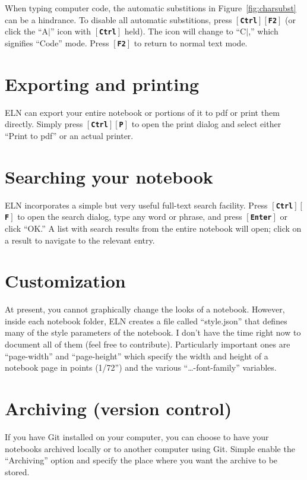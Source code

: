 \documentclass[11pt]{report}
\def\keystroke#1{$\left[\right.\!${\tt\bfseries #1}$\!\left.\right]$}
\def\key#1{\keystroke{#1}}
\def\keycombo#1#2{\keystroke{#1}\keystroke{#2}}
\def\keycontrol#1{\keycombo{Ctrl}{#1}}
\begin{document}
When typing computer code, the automatic substitions in
Figure~\ref{fig:charsubst} can be a hindrance. To disable all
automatic substitions, press \keycontrol{F2} (or click the
``A\hbox{$|$}'' icon with \key{Ctrl} held). The icon will
change to ``C\hbox{$|$},'' which signifies ``Code''
mode. Press \key{F2} to return to normal text mode.

\section{Exporting and printing}

ELN can export your entire notebook or portions of it to pdf or print
them directly. Simply press \keycontrol{P} to open the print dialog
and select either ``Print to pdf'' or an actual printer.

\section{Searching your notebook}

ELN incorporates a simple but very useful full-text search
facility. Press \keycontrol{F} to open the search dialog, type any
word or phrase, and press \key{Enter} or click ``OK.'' A list with
search results from the entire notebook will open; click on a result
to navigate to the relevant entry.

\section{Customization}

At present, you cannot graphically change the looks of a
notebook. However, inside each notebook folder, ELN creates a file
called ``style.json'' that defines many of the style parameters of the
notebook. I don't have the time right now to document all of them
(feel free to contribute). Particularly important ones are
``page-width'' and ``page-height'' which specify the width and height
of a notebook page in points (1/72'') and the various
``\ldots-font-family'' variables.

\section{Archiving (version control)}

If you have Git installed on your computer, you can choose to have
your notebooks archived locally or to another computer using
Git. Simple enable the ``Archiving'' option and specify the place
where you want the archive to be stored.
\end{document}
